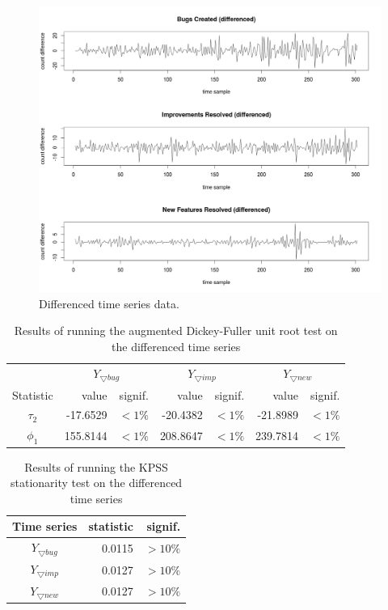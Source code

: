 \documentclass[a4paper]{scrartcl}
\begin{document}
\begin{figure}[htbp!]
\begin{center}
\includegraphics[width=\textwidth]{assets/time_series_diff}
\caption{Differenced time series data.}
\label{fig:differenced_time_series}
\end{center}
\end{figure}

\begin{table}[h!]
  \centering
  \begin{tabular}{ c | r r | r r | r r }
      & \multicolumn{2}{|c|}{$Y_{\bigtriangledown bug}$} & \multicolumn{2}{|c|}{$Y_{\bigtriangledown imp}$} & \multicolumn{2}{|c}{$Y_{\bigtriangledown new}$} \\
    Statistic & value & signif. & value & signif. & value & signif. \\
    \hline
    $\tau_2$ & -17.6529 & $< 1\%$ & -20.4382 & $< 1\%$ & -21.8989 & $< 1\%$ \\
    $\phi_1$ & 155.8144 & $< 1\%$ & 208.8647 & $< 1\%$ & 239.7814 & $< 1\%$ \\
    \hline
  \end{tabular}
\caption{Results of running the augmented Dickey-Fuller unit root test on the differenced time series}
\label{tab:first_diff_unit_root_results}
\end{table}

\begin{table}[h!]
  \centering
  \begin{tabular}{ c | r r }
    Time series & statistic & signif. \\
    \hline
    $Y_{\bigtriangledown bug}$ & 0.0115 & $> 10\%$ \\
    $Y_{\bigtriangledown imp}$ & 0.0127 & $> 10\%$ \\
    $Y_{\bigtriangledown new}$ & 0.0127 & $> 10\%$ \\
    \hline
  \end{tabular}
\caption{Results of running the KPSS stationarity test on the differenced time series}
\label{tab:first_diff_stationarity_results}
\end{table}
\end{document}
